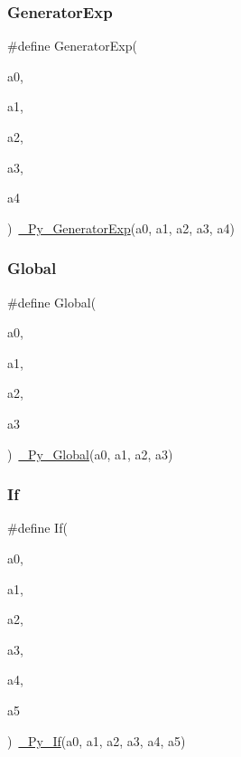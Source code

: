 \subsubsection{\texorpdfstring{GeneratorExp}{GeneratorExp}}
{\footnotesize\ttfamily \#define Generator\+Exp(\begin{DoxyParamCaption}\item[{}]{a0,  }\item[{}]{a1,  }\item[{}]{a2,  }\item[{}]{a3,  }\item[{}]{a4 }\end{DoxyParamCaption})~\mbox{\hyperlink{_python-ast_8h_a2e8fb0398e6235d848e31d61b4f34289}{\+\_\+\+Py\+\_\+\+Generator\+Exp}}(a0, a1, a2, a3, a4)}

\mbox{\label{_python-ast_8h_a84df3f9175f02c4e11e66859646892f7}} 
\subsubsection{\texorpdfstring{Global}{Global}}
{\footnotesize\ttfamily \#define Global(\begin{DoxyParamCaption}\item[{}]{a0,  }\item[{}]{a1,  }\item[{}]{a2,  }\item[{}]{a3 }\end{DoxyParamCaption})~\mbox{\hyperlink{_python-ast_8h_a7070f4e0f5c60bfcaaa0ca6b0c42c840}{\+\_\+\+Py\+\_\+\+Global}}(a0, a1, a2, a3)}

\mbox{\label{_python-ast_8h_a3caa32cf8ff8db15e5835f5e40e6c6f8}} 
\subsubsection{\texorpdfstring{If}{If}}
{\footnotesize\ttfamily \#define If(\begin{DoxyParamCaption}\item[{}]{a0,  }\item[{}]{a1,  }\item[{}]{a2,  }\item[{}]{a3,  }\item[{}]{a4,  }\item[{}]{a5 }\end{DoxyParamCaption})~\mbox{\hyperlink{_python-ast_8h_a4576b4b5b479fe67421c45bc1fcab077}{\+\_\+\+Py\+\_\+\+If}}(a0, a1, a2, a3, a4, a5)}

